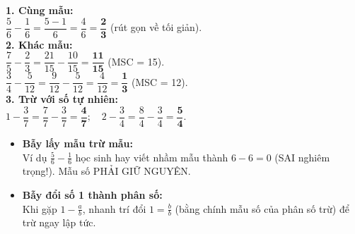 \documentclass[14pt,a4paper,oneside]{extbook}
\begin{document}
\vspace{-2.5mm}
\noindent
\begin{minipage}[t]{0.49\textwidth}\vspace{0pt}
\begin{tcolorbox}[
  enhanced,
  colback=green!4!white,
  colframe=green!60!black,
  arc=2mm, boxrule=0.8pt,
  left=2mm, right=2mm, top=1.8mm, bottom=1.8mm,
  title={\footnotesize\bfseries\color{white}\faCheckCircle\ Ví dụ thực hành chuẩn mực}
]
{\footnotesize
\textbf{1. Cùng mẫu:}\\
$\dfrac{5}{6} - \dfrac{1}{6} = \dfrac{5 - 1}{6} = \dfrac{4}{6} = \mathbf{\dfrac{2}{3}}$ (rút gọn về tối giản).\\
\textbf{2. Khác mẫu:}\\
$\dfrac{7}{5} - \dfrac{2}{3} = \dfrac{21}{15} - \dfrac{10}{15} = \mathbf{\dfrac{11}{15}}$ (MSC = 15).\\
$\dfrac{3}{4} - \dfrac{5}{12} = \dfrac{9}{12} - \dfrac{5}{12} = \dfrac{4}{12} = \mathbf{\dfrac{1}{3}}$ (MSC = 12).\\
\textbf{3. Trừ với số tự nhiên:}\\
$1 - \dfrac{3}{7} = \dfrac{7}{7} - \dfrac{3}{7} = \mathbf{\dfrac{4}{7}}; \quad 2 - \dfrac{3}{4} = \dfrac{8}{4} - \dfrac{3}{4} = \mathbf{\dfrac{5}{4}}$.
}
\end{tcolorbox}
\end{minipage}
\hfill
\begin{minipage}[t]{0.49\textwidth}\vspace{0pt}
\begin{tcolorbox}[
  enhanced,
  colback=red!4!white,
  colframe=red!70!black,
  arc=2mm, boxrule=0.8pt,
  left=2mm, right=2mm, top=1.8mm, bottom=1.8mm,
  title={\footnotesize\bfseries\color{white}\faExclamationTriangle\ Mẹo tránh bẫy trắc nghiệm}
]
{\footnotesize
\begin{itemize}\setlength{\itemsep}{1.5pt}\setlength{\leftskip}{-2.5mm}
  \item \textbf{Bẫy lấy mẫu trừ mẫu:}\\
  Ví dụ $\frac{5}{6} - \frac{1}{6}$ học sinh hay viết nhầm mẫu thành $6 - 6 = 0$ (SAI nghiêm trọng!). Mẫu số PHẢI GIỮ NGUYÊN.
  \item \textbf{Bẫy đổi số 1 thành phân số:}\\
  Khi gặp $1 - \frac{a}{b}$, nhanh trí đổi $1 = \frac{b}{b}$ (bằng chính mẫu số của phân số trừ) để trừ ngay lập tức.
\end{itemize}
}
\end{tcolorbox}
\end{minipage}
\end{document}
